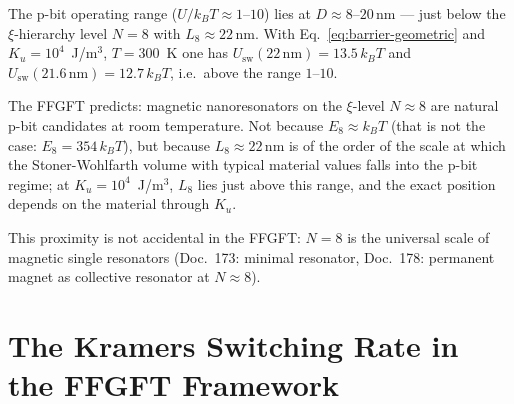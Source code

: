 	\begin{center}
	\end{center}
	
	The p-bit operating range ($U/k_BT \approx 1$--$10$) lies at
	$D \approx 8$--$20\,\text{nm}$ --- just below the
	$\xi$-hierarchy level $N = 8$ with $L_8 \approx 22\,\text{nm}$.
	With Eq.~\eqref{eq:barrier-geometric} and $K_u = 10^4$~J/m$^3$, $T = 300$~K one has
	$U_\text{sw}(22\,\text{nm}) = 13.5\,k_BT$ and $U_\text{sw}(21.6\,\text{nm}) = 12.7\,k_BT$,
	i.e.\ above the range $1$--$10$.
	
	\begin{foundation}[Geometric prediction: $N=8$ as natural p-bit anchor]
		The FFGFT predicts: magnetic nanoresonators on the
		$\xi$-level $N \approx 8$ are natural p-bit candidates at
		room temperature. Not because $E_8 \approx k_BT$ (that is not the case:
		$E_8 = 354\,k_BT$), but because $L_8 \approx 22\,\text{nm}$ is of the
		order of the scale at which the Stoner-Wohlfarth volume with
		typical material values falls into the p-bit regime; at
		$K_u = 10^4$~J/m$^3$, $L_8$ lies just above this range, and the exact
		position depends on the material through $K_u$.
		
		This proximity is not accidental in the FFGFT:
		$N=8$ is the universal scale of magnetic single resonators
		(Doc.~173: minimal resonator, Doc.~178: permanent magnet as
		collective resonator at $N\approx8$).
	\end{foundation}
	
	\section{The Kramers Switching Rate in the FFGFT Framework}
	\label{sec:kramers}
	
